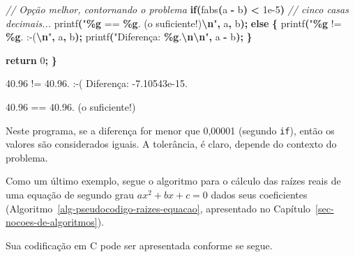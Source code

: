 \documentclass[
  11pt,
  a4paper,
]{scrbook}
\newenvironment{Shaded}{\begin{snugshade}}{\end{snugshade}}
\newcommand{\CommentTok}[1]{\textcolor[rgb]{0.56,0.35,0.01}{\textit{#1}}}
\newcommand{\ControlFlowTok}[1]{\textcolor[rgb]{0.13,0.29,0.53}{\textbf{#1}}}
\newcommand{\DecValTok}[1]{\textcolor[rgb]{0.00,0.00,0.81}{#1}}
\newcommand{\FloatTok}[1]{\textcolor[rgb]{0.00,0.00,0.81}{#1}}
\newcommand{\NormalTok}[1]{#1}
\newcommand{\OperatorTok}[1]{\textcolor[rgb]{0.81,0.36,0.00}{\textbf{#1}}}
\newcommand{\SpecialCharTok}[1]{\textcolor[rgb]{0.81,0.36,0.00}{\textbf{#1}}}
\newcommand{\StringTok}[1]{\textcolor[rgb]{0.31,0.60,0.02}{#1}}
\begin{document}
\begin{tcolorbox}
\begin{Shaded}
\begin{Highlighting}[]
    \CommentTok{// Opção melhor, contornando o problema}
    \ControlFlowTok{if}\OperatorTok{(}\NormalTok{fabs}\OperatorTok{(}\NormalTok{a }\OperatorTok{{-}}\NormalTok{ b}\OperatorTok{)} \OperatorTok{\textless{}} \FloatTok{1e{-}5}\OperatorTok{)}  \CommentTok{// cinco casas decimais...}
\NormalTok{        printf}\OperatorTok{(}\StringTok{"}\SpecialCharTok{\%g}\StringTok{ == }\SpecialCharTok{\%g}\StringTok{. (o suficiente!)}\SpecialCharTok{\textbackslash{}n}\StringTok{"}\OperatorTok{,}\NormalTok{ a}\OperatorTok{,}\NormalTok{ b}\OperatorTok{);}
    \ControlFlowTok{else} \OperatorTok{\{}
\NormalTok{        printf}\OperatorTok{(}\StringTok{"}\SpecialCharTok{\%g}\StringTok{ != }\SpecialCharTok{\%g}\StringTok{.  :{-}(}\SpecialCharTok{\textbackslash{}n}\StringTok{"}\OperatorTok{,}\NormalTok{ a}\OperatorTok{,}\NormalTok{ b}\OperatorTok{);}
\NormalTok{        printf}\OperatorTok{(}\StringTok{"Diferença: }\SpecialCharTok{\%g}\StringTok{.}\SpecialCharTok{\textbackslash{}n\textbackslash{}n}\StringTok{"}\OperatorTok{,}\NormalTok{ a }\OperatorTok{{-}}\NormalTok{ b}\OperatorTok{);}
    \OperatorTok{\}}

    \ControlFlowTok{return} \DecValTok{0}\OperatorTok{;}
\OperatorTok{\}}
\end{Highlighting}
\end{Shaded}

\begin{Shaded}
\begin{Highlighting}[]
\NormalTok{40.96 != 40.96.  :{-}(}
\NormalTok{Diferença: {-}7.10543e{-}15.}

\NormalTok{40.96 == 40.96. (o suficiente!)}
\end{Highlighting}
\end{Shaded}

Neste programa, se a diferença for menor que 0,00001 (segundo
\texttt{if}), então os valores são considerados iguais. A tolerância, é
claro, depende do contexto do problema.

\end{tcolorbox}

Como um último exemplo, segue o algoritmo para o cálculo das raízes
reais de uma equação de segundo grau \({ax^2 + bx + c = 0}\) dados seus
coeficientes (Algoritmo~\ref{alg-pseudocodigo-raizes-equacao},
apresentado no Capítulo~\ref{sec-nocoes-de-algoritmos}).

Sua codificação em C pode ser apresentada conforme se segue.
\end{document}
